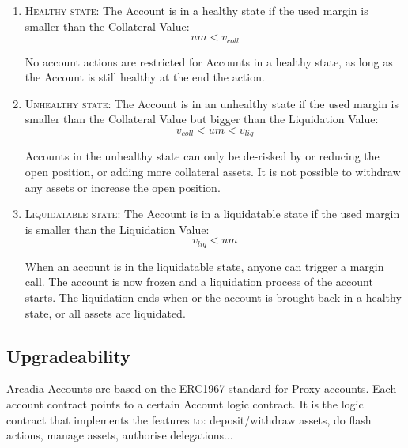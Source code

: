 \documentclass[sigconf,nonacm]{acmart}
\begin{document}
\begin{enumerate}
    \item \textsc{Healthy state:} The Account is in a healthy state if the used margin is smaller than the Collateral Value:
        \begin{equation}
            um < v_{coll}
        \end{equation}

        No account actions are restricted for Accounts in a healthy state, as long as the Account is still healthy at the end the action.
    \item \textsc{Unhealthy state:} The Account is in an unhealthy state if the used margin is smaller than the Collateral Value but bigger than the Liquidation Value:
        \begin{equation}
            v_{coll} < um < v_{liq}
        \end{equation}
        
        Accounts in the unhealthy state can only be de-risked by or reducing the open position, or adding more collateral assets.
        It is not possible to withdraw any assets or increase the open position.
    \item \textsc{Liquidatable state:} The Account is in a liquidatable state if the used margin is smaller than the Liquidation Value:
        \begin{equation}
            v_{liq} < um
        \end{equation}
        
        When an account is in the liquidatable state, anyone can trigger a margin call.
        The account is now frozen and a liquidation process of the account starts.
        The liquidation ends when or the account is brought back in a healthy state, or all assets are liquidated.
\end{enumerate}

\subsection{Upgradeability}
\label{subsec:upgradeability}


Arcadia Accounts are based on the ERC1967 standard for Proxy accounts.
Each account contract points to a certain Account logic contract.
It is the logic contract that implements the features to: deposit/withdraw assets, do flash actions, manage assets, authorise delegations...
\end{document}
